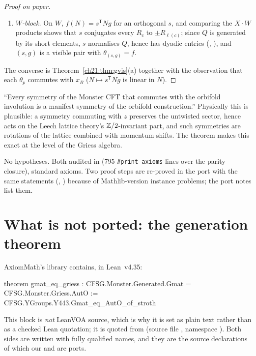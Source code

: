 \begin{proof}[Proof on paper]
\begin{enumerate}[label=(\alph*)]
  to sign, is rational with denominators dividing $8$, and preserves $\Leech$: $g\in\mathrm{Co}_0$
  (, ).
\item \emph{$W$-block.}  On $W$, $f(N)=s^{\mathsf T}Ng$ for an orthogonal $s$, and comparing the $X\cdot W$
  products shows that $s$ conjugates every $R_c$ to $\pm R_{\ell(c)}$; since $Q$ is generated by its short
  elements, $s$ normalises $Q$, hence has dyadic entries (,
  ), and $(s,g)$ is a visible pair with $\theta_{(s,g)}=f$.
\end{enumerate}
The converse is Theorem~\ref{ch21:thm:gvis}(a) together with the observation that each $\theta_p$
commutes with $x_B$ ($N\mapsto s^{\mathsf T}Ng$ is linear in $N$).
\end{proof}
\begin{physics}
``Every symmetry of the Monster CFT that commutes with the orbifold involution is a manifest
symmetry of the orbifold construction.''  Physically this is plausible: a symmetry commuting with $z$
preserves the untwisted sector, hence acts on the Leech lattice theory's ${\mathbb{Z}}/2$-invariant part, and
such symmetries are rotations of the lattice combined with momentum shifts.  The theorem makes this
exact at the level of the Griess algebra.
\end{physics}
\begin{status}
No hypotheses.  Both audited in  (795 \texttt{\#print axioms} lines over the
parity closure), standard axioms.  Two proof steps are re-proved in the port with the same statements
(, ) because of Mathlib-version instance problems; the
port notes list them.
\end{status}

\section{What is not ported: the generation theorem}\label{ch21:sec:notported}

AxiomMath's library contains, in Lean~v4.35:
\begin{plaincode}
theorem gmat_eq_griess :
    CFSG.Monster.Generated.Gmat = CFSG.Monster.Griess.AutO :=
  CFSG.YGroups.Y443.Gmat_eq_AutO_of_stroth
\end{plaincode}
This block is \emph{not} LeanVOA source, which is why it is set as plain text rather than as a
checked Lean quotation; it is quoted from  (source
file , namespace
).  Both sides are written with fully qualified names,
and they are the source declarations of which our  and  are ports.

